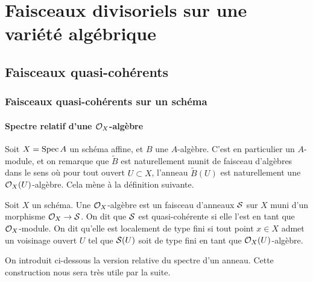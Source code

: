 \chapter{Faisceaux divisoriels sur une variété algébrique}


\section{Faisceaux quasi-cohérents}

\subsection{Faisceaux quasi-cohérents sur un schéma}


\subsubsection{Spectre relatif d'une $\Oo_X$-algèbre}

Soit $X=\operatorname{Spec} A$ un schéma affine, et $B$ une $A$-algèbre. C'est en particulier un $A$-module, et on remarque que $\widetilde{B}$ est naturellement munit de faisceau d'algèbres dans le sens où pour tout ouvert $U\subset X$, l'anneau $\widetilde{B}(U)$ est naturellement une $\mathcal{O}_X(U)$-algèbre. Cela mène à la définition suivante.

\begin{defn}[$\Oo_X$-algèbre]
Soit $X$ un schéma. Une $\Oo_X$-algèbre est un faisceau d'anneaux $\mathcal{S}$ sur $X$ muni d'un morphisme $\mathcal{O}_X\rightarrow \mathcal{S}$. On dit que $\mathcal{S}$ est quasi-cohérente si elle l'est en tant que $\Oo_X$-module. On dit qu'elle est localement de type fini si tout point $x\in X$ admet un voisinage ouvert $U$ tel que $\mathcal{S}(U)$ soit de type fini en tant que $\mathcal{O}_X(U)$-algèbre.
\end{defn}

On introduit ci-dessous la version relative du spectre d'un anneau. Cette construction nous sera très utile par la suite.

